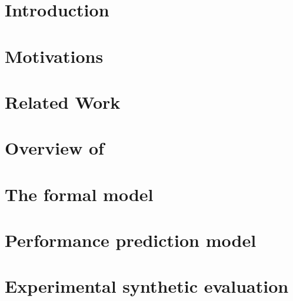 \documentclass[5p]{elsarticle}
\begin{document}
\section{Introduction}
\label{sec:introduction}


\section{Motivations}
\label{sec:motivation}


\section{Related Work}
\label{sec:related_work}


\section{Overview of \mad}
\label{sec:mad_model}


\section{The \mad formal model}
\label{sec:formal_model}


\section{Performance prediction model}
\label{sec:perf_model}


\section{Experimental synthetic evaluation}
\label{sec:evaluations}

\end{document}
